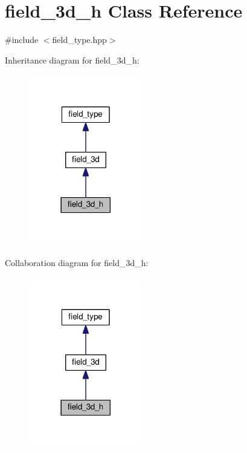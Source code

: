 \hypertarget{classfield__3d__h}{}\section{field\+\_\+3d\+\_\+h Class Reference}
\label{classfield__3d__h}


{\ttfamily \#include $<$field\+\_\+type.\+hpp$>$}



Inheritance diagram for field\+\_\+3d\+\_\+h\+:\nopagebreak
\begin{figure}[H]
\begin{center}
\leavevmode
\includegraphics[width=141pt]{d7/d5b/classfield__3d__h__inherit__graph}
\end{center}
\end{figure}


Collaboration diagram for field\+\_\+3d\+\_\+h\+:\nopagebreak
\begin{figure}[H]
\begin{center}
\leavevmode
\includegraphics[width=141pt]{dd/d2a/classfield__3d__h__coll__graph}
\end{center}
\end{figure}
